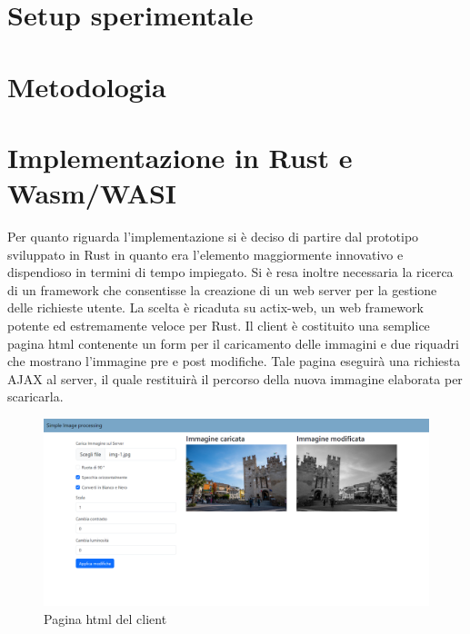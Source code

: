\section{Setup sperimentale}
\section{Metodologia}
\newpage
\section{Implementazione in Rust e Wasm/WASI}
Per quanto riguarda l'implementazione si è deciso di partire dal prototipo sviluppato in Rust in quanto era l'elemento maggiormente innovativo e dispendioso in termini di tempo impiegato.
Si è resa inoltre necessaria la ricerca di un framework che consentisse la creazione di un web server per la gestione delle richieste utente.
La scelta è ricaduta su actix-web, un web framework potente ed estremamente veloce per Rust.
Il client è costituito una semplice pagina html contenente un form per il caricamento delle immagini e due riquadri che mostrano l'immagine pre e post modifiche. Tale pagina eseguirà una richiesta AJAX al server, il quale restituirà il percorso della nuova immagine elaborata per scaricarla.
\begin{figure}
    \begin{center}
            \includegraphics[width=1\columnwidth]{images/client.png}
    \end{center}
    \caption{Pagina html del client}
    \label{fig:client}
\end{figure}
